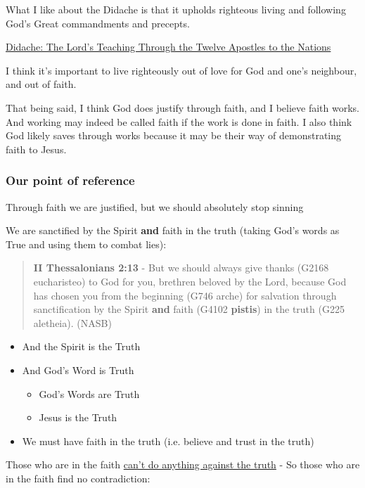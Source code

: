 \documentclass[11pt]{article}
\begin{document}
What I like about the Didache is that it upholds righteous living and following God's Great commandments and precepts.

\href{https://www.earlychristianwritings.com/text/didache-roberts.html}{Didache: The Lord's Teaching Through the Twelve Apostles to the Nations}

I think it's important to live righteously out of love for God and one's neighbour, and out of faith.

That being said, I think God does justify through faith, and I believe faith works. And working may indeed be called faith if the work is done in faith.
I also think God likely saves through works because it may be their way of demonstrating faith to Jesus.

\subsubsection{Our point of reference}
\label{sec:org1d43c9f}

Through faith we are justified, but we should absolutely stop sinning

We are sanctified by the Spirit \textbf{and} faith in the truth (taking God's words as True and using them to combat lies):

\begin{quote}
\textbf{II Thessalonians 2:13} - But we should always give thanks (G2168 eucharisteo) to God for you, brethren beloved by the Lord, because God has chosen you from the beginning (G746 arche) for salvation through sanctification by the Spirit \textbf{and} faith (G4102 \textbf{pistis}) in the truth (G225 aletheia). (NASB)
\end{quote}

\begin{itemize}
\item And the Spirit is the Truth
\item And God's Word is Truth
\begin{itemize}
\item God's Words are Truth
\item Jesus is the Truth
\end{itemize}
\item We must have faith in the truth (i.e. believe and trust in the truth)
\end{itemize}

Those who are in the faith \uline{can't do anything against the truth} - So those who are in the faith find no contradiction:
\end{document}
